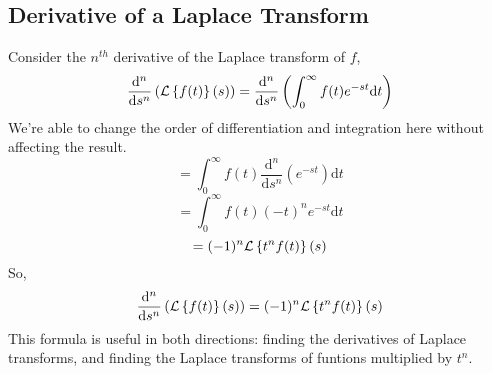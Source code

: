 \subsection{Derivative of a Laplace Transform}
\noindent
Consider the $n^{th}$ derivative of the Laplace transform of $f$,
\begin{equation*}
	\frac{\mathrm{d}^n}{\mathrm{d}s^n}\left(\mathcal{L}\left\{ f(t) \right\}\left(s\right)\right) = \frac{\mathrm{d}^n}{\mathrm{d}s^n}\left(\int_{0}^{\infty}{f(t)e^{-st} \mathrm{d}t}\right)
\end{equation*}
We're able to change the order of differentiation and integration here without affecting the result.
\begin{equation*}
	 = \int_{0}^{\infty}{f(t)\frac{\mathrm{d}^n}{\mathrm{d}s^n}\left(e^{-st}\right) \mathrm{d}t}
\end{equation*}
\begin{equation*}
	= \int_{0}^{\infty}{f(t)(-t)^ne^{-st} \mathrm{d}t}
\end{equation*}
\begin{equation*}
	 = (-1)^n\mathcal{L}\left\{ t^nf(t) \right\}\left(s\right)
\end{equation*}
So,
\begin{equation*}
	\frac{\mathrm{d}^n}{\mathrm{d}s^n}\left(\mathcal{L}\left\{ f(t) \right\}\left(s\right)\right) = (-1)^n\mathcal{L}\left\{ t^nf(t) \right\}\left(s\right)
\end{equation*}
This formula is useful in both directions: finding the derivatives of Laplace transforms, and finding the Laplace transforms of funtions multiplied by $t^n$.